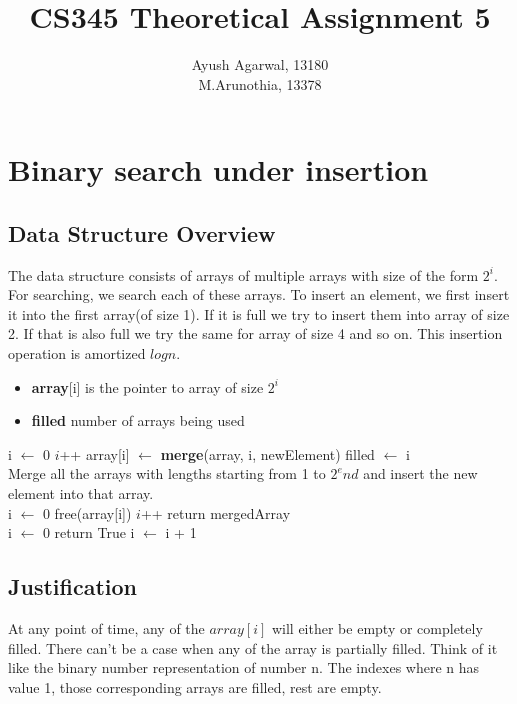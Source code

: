 \documentclass{article}
\title{CS345 Theoretical Assignment 5 \\ }
\author{\vspace{2mm} \large Ayush Agarwal, 13180 \\ M.Arunothia, 13378}
\date{}
\begin{document}
\maketitle
\tableofcontents

\newpage
\section{Binary search under insertion}
\subsection{Data Structure Overview}
The data structure consists of arrays of multiple arrays with size of the form $2^i$. For searching, we search each of these arrays. To insert an element,
we first insert it into the first array(of size 1). If it is full we try to insert them into array of size 2. If that is also full we try the same for array 
of size 4 and so on. This insertion operation is amortized $logn$.
\begin{itemize}
  \item \textbf{array}[i] is the pointer to array of size $2^i$
  \item \textbf{filled} number of arrays being used
\end{itemize}

\begin{algorithmic}[1]
    \State i $\gets$ 0
    \State $i$++
    \EndWhile
    \State array[i] $\gets$ \textbf{merge}(array, i, newElement)
      \State filled $\gets$ i
    \EndIf
  \EndProcedure
  \\
    \State Merge all the arrays with lengths starting from 1 to $2^end$ and insert the new element into that array.\\
    \State i $\gets$ 0
      \State free(array[i])
      \State $i$++
    \EndWhile
    \State return mergedArray
  \EndProcedure
  \\
    \State i $\gets$ 0
    \State return True
    \EndIf
    \State i $\gets$ i + 1
    \EndWhile
  \EndProcedure

\end{algorithmic}

\subsection{Justification}
At any point of time, any of the $array[i]$ will either be empty or completely filled. There can't be a case when any of the array is partially filled. Think of 
it like the binary number representation of number n. The indexes where n has value 1, those corresponding arrays are filled, rest are empty.
\end{document}

